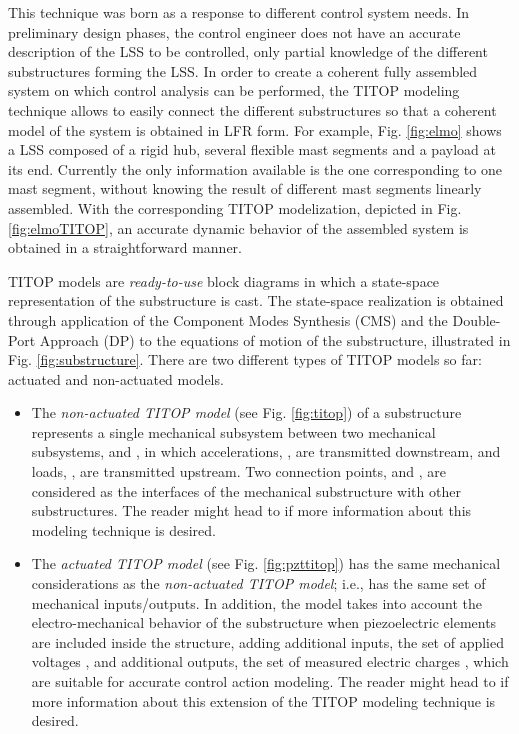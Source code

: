 \documentclass{ifacconf}
\begin{document}
This technique was born as a response to different control system needs. In preliminary design phases, the control engineer does not have an accurate description of the LSS to be controlled, only partial knowledge of the different substructures forming the LSS. In order to create a coherent fully assembled system on which control analysis can be performed, the TITOP modeling technique allows to easily connect the different substructures so that a coherent model of the system is obtained in LFR form. For example, Fig. \ref{fig:elmo} shows a LSS composed of a rigid hub, several flexible mast segments and a payload at its end. Currently the only information available is the one corresponding to one mast segment, without knowing the result of different mast segments linearly assembled. With the corresponding TITOP modelization, depicted in Fig. \ref{fig:elmoTITOP}, an accurate dynamic behavior of the assembled system is obtained in a straightforward manner.

TITOP models are \textit{ready-to-use} block diagrams in which a state-space representation of the substructure is cast. The state-space realization is obtained through application of the Component Modes Synthesis (CMS) \citep{Hurty1965_CM} and the Double-Port Approach (DP) \citep{Alazard2015_LM} to the equations of motion of the substructure, illustrated in Fig. \ref{fig:substructure}. There are two different types of TITOP models so far: actuated and non-actuated models.

\begin{itemize}
\item The \emph{non-actuated TITOP model} (see Fig. \ref{fig:titop}) of a substructure  represents a single mechanical subsystem between two mechanical subsystems,  and , in which accelerations, , are transmitted downstream, and loads, , are transmitted upstream. Two connection points,  and , are considered as the interfaces of the mechanical substructure with other substructures. The reader might head to \cite{Perez2015_LM} if more information about this modeling technique is desired.

\item The \emph{actuated TITOP model} (see Fig. \ref{fig:pzttitop}) has the same mechanical considerations as the \emph{non-actuated TITOP model}; i.e., has the same set of mechanical inputs/outputs. In addition, the model takes into account the electro-mechanical behavior of the substructure when piezoelectric elements are included inside the structure, adding additional inputs, the set of applied voltages , and additional outputs, the set of measured electric charges , which are suitable for accurate control action modeling. The reader might head to \cite{Perez2016_PEA} if more information about this extension of the TITOP modeling technique is desired.
\end{itemize}
\end{document}
